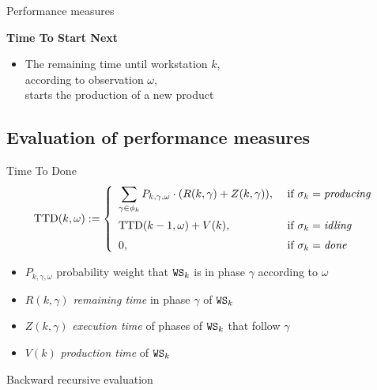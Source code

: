 \begin{frame}{Performance measures}
      \vspace{\vspacegap}
      \begin{minipage}{\descriptionwidth}
        \textbf{Time To Start Next}
        \begin{itemize}
          \item The remaining time until workstation $k$,\\
            according to observation $\omega$,\\
            starts the production of a new product
        \end{itemize}
      \end{minipage}
      \begin{minipage}{\schemawidth}
        \begin{center}\scalebox{\schemascale}{}\end{center}
      \end{minipage}
    \end{frame}
     
  \subsection{Evaluation of performance measures}
    \begin{frame}{Time To Done}
      \begin{equation*}
        \mbox{TTD}(k,\omega) := \left\{ \begin{array}{ll}
          \displaystyle \sum_{\gamma\in \phi_k} P_{k, \gamma,\omega} \cdot (R(k,\gamma) + Z(k,\gamma)), &  \mbox{ if } \sigma_k=\mbox{\em producing}
          \medskip\\
          \mbox{TTD}(k-1,\omega) + V(k), & \mbox{ if } \sigma_k=\mbox{\em idling}
          \medskip\\
          0, & \mbox{ if } \sigma_k=\mbox{\em done}
        \end{array} \right.
        \label{eq:ttd}
      \end{equation*}
      
      \begin{itemize}
        \item $P_{k,\gamma,\omega}$ probability weight that $\mathtt{WS}_k$ is in phase $\gamma$ according to $\omega$
        \item $R(k,\gamma)$ \textit{remaining time} in phase $\gamma$ of $\mathtt{WS}_k$
        \item $Z(k,\gamma)$ \textit{execution time} of phases of $\mathtt{WS}_k$ that follow $\gamma$
        \item $V(k)$ \textit{production time} of $\mathtt{WS}_k$
      \end{itemize}
      
      \begin{center}\hspace{-0.5cm}\scalebox{0.8}{}\end{center}
      
      Backward recursive evaluation
    \end{frame}
    
